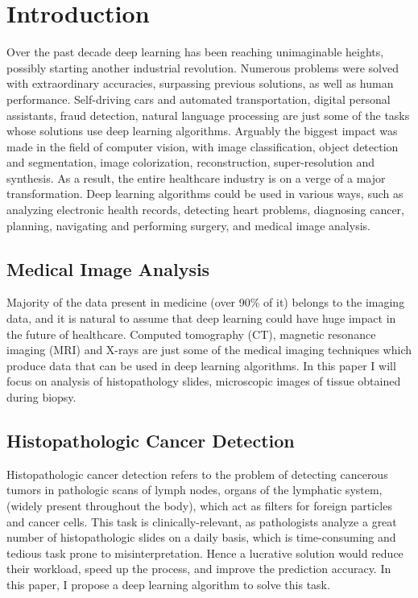 \chapter{Introduction}
\label{ch:intro}

Over the past decade deep learning has been reaching unimaginable heights, possibly starting another industrial revolution. Numerous problems were solved with extraordinary accuracies, surpassing previous solutions, as well as human performance. Self-driving cars and automated transportation, digital personal assistants, fraud detection, natural language processing are just some of the tasks whose solutions use deep learning algorithms. Arguably the biggest impact was made in the field of computer vision, with image classification, object detection and segmentation, image colorization, reconstruction, super-resolution and synthesis. As a result, the entire healthcare industry is on a verge of a major transformation. Deep learning algorithms could be used in various ways, such as analyzing electronic health records, detecting heart problems, diagnosing cancer, planning, navigating and performing surgery, and medical image analysis.

\section{Medical Image Analysis}

Majority of the data present in medicine (over 90\% of it) belongs to the imaging data, and it is natural to assume that deep learning could have huge impact in the future of healthcare. Computed tomography (CT), magnetic resonance imaging (MRI) and X-rays are just some of the medical imaging techniques which produce data that can be used in deep learning algorithms. In this paper I will focus on analysis of histopathology slides, microscopic images of tissue obtained during biopsy.

\section{Histopathologic Cancer Detection}
Histopathologic cancer detection refers to the problem of detecting cancerous tumors in pathologic scans of lymph nodes, organs of the lymphatic system, (widely present throughout the body), which act as filters for foreign particles and cancer cells. This task is clinically-relevant, as pathologists analyze a great number of histopathologic slides on a daily basis, which is time-consuming and tedious task prone to misinterpretation. Hence a lucrative solution would reduce their workload, speed up the process, and improve the prediction accuracy. In this paper, I propose a deep learning algorithm to solve this task.

